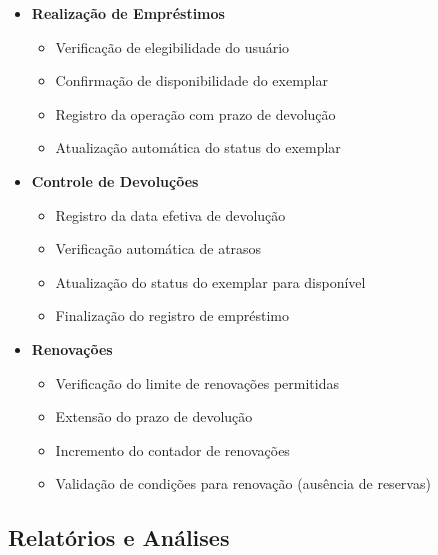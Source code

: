 \documentclass[12pt,a4paper]{article}
\begin{document}
\begin{conceptbox}
\begin{itemize}
    \item \textbf{Realização de Empréstimos}
    \begin{itemize}
        \item Verificação de elegibilidade do usuário
        \item Confirmação de disponibilidade do exemplar
        \item Registro da operação com prazo de devolução
        \item Atualização automática do status do exemplar
    \end{itemize}

    \item \textbf{Controle de Devoluções}
    \begin{itemize}
        \item Registro da data efetiva de devolução
        \item Verificação automática de atrasos
        \item Atualização do status do exemplar para disponível
        \item Finalização do registro de empréstimo
    \end{itemize}

    \item \textbf{Renovações}
    \begin{itemize}
        \item Verificação do limite de renovações permitidas
        \item Extensão do prazo de devolução
        \item Incremento do contador de renovações
        \item Validação de condições para renovação (ausência de reservas)
    \end{itemize}
\end{itemize}
\end{conceptbox}

\subsection{Relatórios e Análises}
\end{document}
